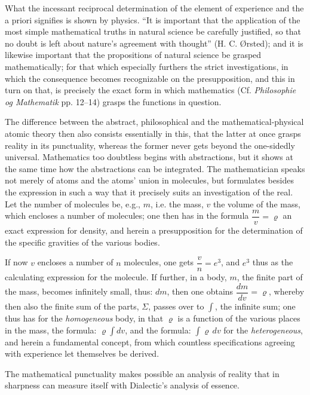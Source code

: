 \documentclass[12pt]{book}
\begin{document}
What the incessant reciprocal determination of the element of experience and the a
priori signifies is shown by physics. ``It is important that the application of the
most simple mathematical truths in natural science be carefully justified, so that
no doubt is left about nature's agreement with thought'' (H. C. Ørsted); and it is
likewise important that the propositions of natural science be grasped
mathematically; for that which especially furthers the strict investigations, in
which the consequence becomes recognizable on the presupposition, and this in turn
on that, is precisely the exact form in which mathematics (Cf. \emph{Philosophie og
Mathematik} pp. 12--14) grasps the functions in question.

The difference between the abstract, philosophical and the mathematical-physical
atomic theory then also consists essentially in this, that the latter at once
grasps reality in its punctuality, whereas the former never gets beyond the
one-sidedly universal. Mathematics too doubtless begins with abstractions, but it
shows at the same time how the abstractions can be integrated. The mathematician
speaks not merely of atoms and the atoms' union in molecules, but formulates
besides the expression in such a way that it precisely suits an investigation of
the real. Let the number of molecules be, e.g., $m$, i.e. the mass, $v$ the volume
of the mass, which encloses a number of molecules; one then has in the formula
$\dfrac{m}{v} = \varrho$ an exact expression for density, and herein a
presupposition for the determination of the specific gravities of the various
bodies.

If now $v$ encloses a number of $n$ molecules, one gets $\dfrac{v}{n} = e^3$, and
$e^3$ thus as the calculating expression for the molecule. If further, in a body,
$m$, the finite part of the mass, becomes infinitely small, thus: $dm$, then one
obtains $\dfrac{dm}{dv} = \varrho$, whereby then also the finite sum of the parts,
$\Sigma$, passes over to $\int$, the infinite sum; one thus has for the
\emph{homogeneous} body, in that $\varrho$ is a function of the various places in
the mass, the formula: $\varrho\int dv$, and the formula: $\int \varrho\, dv$ for
the \emph{heterogeneous},
and herein a fundamental concept, from which countless specifications agreeing with
experience let themselves be derived.

The mathematical punctuality makes possible an analysis of reality that in
sharpness can measure itself with Dialectic's analysis of essence.
\end{document}
